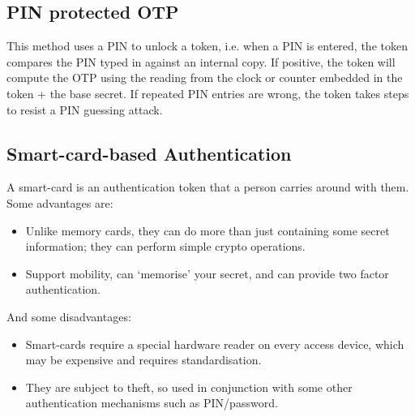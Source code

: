 \documentclass{article}
\begin{document}
\subsection{PIN protected OTP}
This method uses a PIN to unlock a token, i.e. when a PIN is entered, the token compares the PIN typed in against an internal copy. If positive, the token will compute the OTP using the reading from the clock or counter embedded in the token + the base secret. If repeated PIN entries are wrong, the token takes steps to resist a PIN guessing attack.

\subsection{Smart-card-based Authentication}
A smart-card is an authentication token that a person carries around with them. Some advantages are:
\begin{itemize}
  \item Unlike memory cards, they can do more than just containing some secret information; they can perform simple crypto operations.
  \item Support mobility, can `memorise' your secret, and can provide two factor authentication.
\end{itemize}
And some disadvantages:
\begin{itemize}
  \item Smart-cards require a special hardware reader on every access device, which may be expensive and requires standardisation.
  \item They are subject to theft, so used in conjunction with some other authentication mechanisms such as PIN/password.
\end{itemize}
\end{document}
